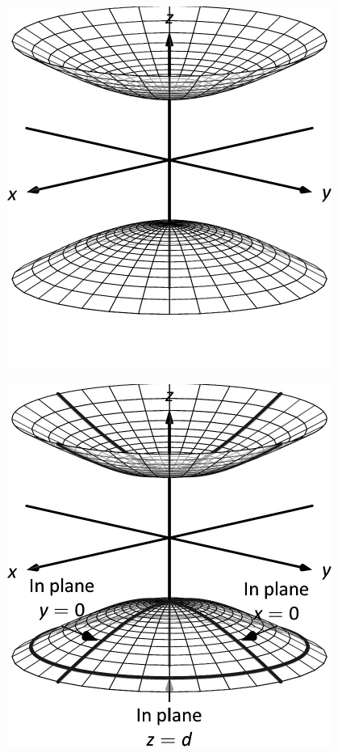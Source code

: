 \documentclass[10pt]{article}
\begin{document}
\includegraphics{figquadric_hyp_two_sheet_3DBW.pdf}
\texttt{}

\includegraphics{figquadric_hyp_two_sheetb_3DBW.pdf}
\texttt{}
\end{document}
